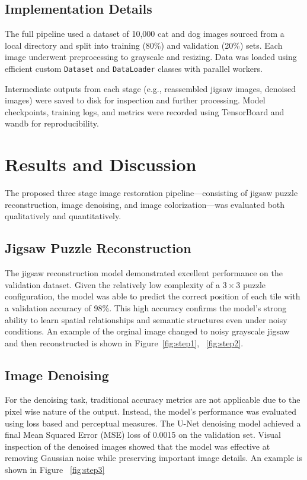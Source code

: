 \documentclass[%
 reprint,
 amsmath,amssymb,
 aps,
]{revtex4-2}
\begin{document}
\subsection{Implementation Details}

The full pipeline used a dataset of 10,000 cat and dog images sourced from a local directory and split into training (80\%) and validation (20\%) sets. Each image underwent preprocessing to grayscale and resizing. Data was loaded using efficient custom \texttt{Dataset} and \texttt{DataLoader} classes with parallel workers.

Intermediate outputs from each stage (e.g., reassembled jigsaw images, denoised images) were saved to disk for inspection and further processing. Model checkpoints, training logs, and metrics were recorded using TensorBoard and wandb for reproducibility.


\section{\label{sec:results}Results and Discussion} %

The proposed three stage image restoration pipeline—consisting of jigsaw puzzle reconstruction, image denoising, and image colorization—was evaluated both qualitatively and quantitatively.

\subsection{Jigsaw Puzzle Reconstruction}

The jigsaw reconstruction model demonstrated excellent performance on the validation dataset. Given the relatively low complexity of a $3\times3$ puzzle configuration, the model was able to predict the correct position of each tile with a validation accuracy of 98\%. This high accuracy confirms the model's strong ability to learn spatial relationships and semantic structures even under noisy conditions. An example of the orginal image changed to noisy grayscale jigsaw and then reconstructed is shown in Figure~\ref{fig:step1}, ~\ref{fig:step2}.

\subsection{Image Denoising}

For the denoising task, traditional accuracy metrics are not applicable due to the pixel wise nature of the output. Instead, the model's performance was evaluated using loss based and perceptual measures. The U-Net denoising model achieved a final Mean Squared Error (MSE) loss of 0.0015 on the validation set. Visual inspection of the denoised images showed that the model was effective at removing Gaussian noise while preserving important image details. An example is shown in Figure ~\ref{fig:step3}
\end{document}

